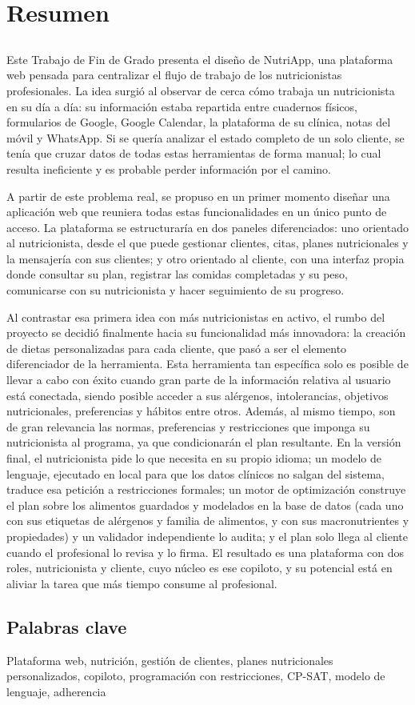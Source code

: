 \chapter*{Resumen}

\section*{\tituloPortadaVal}

Este Trabajo de Fin de Grado presenta el diseño de NutriApp, una plataforma web pensada para centralizar el flujo de trabajo de los nutricionistas profesionales. La idea surgió al observar de cerca cómo trabaja un nutricionista en su día a día: su información estaba repartida entre cuadernos físicos, formularios de Google, Google Calendar, la plataforma de su clínica, notas del móvil y WhatsApp. Si se quería analizar el estado completo de un solo cliente, se tenía que cruzar datos de todas estas herramientas de forma manual; lo cual resulta ineficiente y es probable perder información por el camino.

A partir de este problema real, se propuso en un primer momento diseñar una aplicación web que reuniera todas estas funcionalidades en un único punto de acceso. La plataforma se estructuraría en dos paneles diferenciados: uno orientado al nutricionista, desde el que puede gestionar clientes, citas, planes nutricionales y la mensajería con sus clientes; y otro orientado al cliente, con una interfaz propia donde consultar su plan, registrar las comidas completadas y su peso, comunicarse con su nutricionista y hacer seguimiento de su progreso.

Al contrastar esa primera idea con más nutricionistas en activo, el rumbo del proyecto se decidió finalmente hacia su funcionalidad más innovadora: la creación de dietas personalizadas para cada cliente, que pasó a ser el elemento diferenciador de la herramienta. Esta herramienta tan específica solo es posible de llevar a cabo con éxito cuando gran parte de la información relativa al usuario está conectada, siendo posible acceder a sus alérgenos, intolerancias, objetivos nutricionales, preferencias y hábitos entre otros. Además, al mismo tiempo, son de gran relevancia las normas, preferencias y restricciones que imponga su nutricionista al programa, ya que condicionarán el plan resultante. En la versión final, el nutricionista pide lo que necesita en su propio idioma; un modelo de lenguaje, ejecutado en local para que los datos clínicos no salgan del sistema, traduce esa petición a restricciones formales; un motor de optimización construye el plan sobre los alimentos guardados y modelados en la base de datos (cada uno con sus etiquetas de alérgenos y familia de alimentos, y con sus macronutrientes y propiedades) y un validador independiente lo audita; y el plan solo llega al cliente cuando el profesional lo revisa y lo firma. El resultado es una plataforma con dos roles, nutricionista y cliente, cuyo núcleo es ese copiloto, y su potencial está en aliviar la tarea que más tiempo consume al profesional.

\section*{Palabras clave}

\noindent Plataforma web, nutrición, gestión de clientes, planes nutricionales personalizados, copiloto, programación con restricciones, CP-SAT, modelo de lenguaje, adherencia
